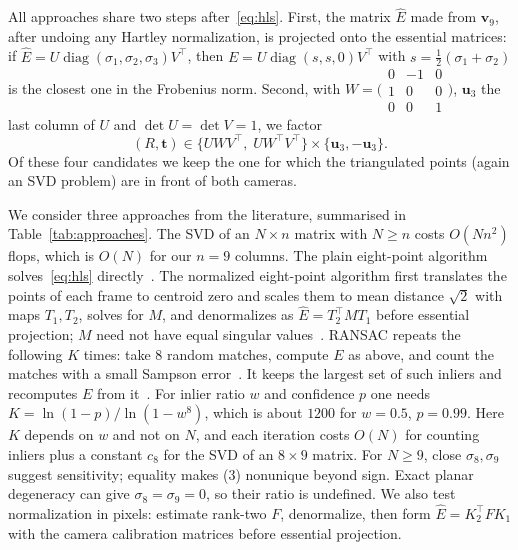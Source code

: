 \documentclass[11pt,a4paper]{article}
\DeclareMathOperator{\diag}{diag}
\theoremstyle{plain}
\theoremstyle{definition}
\theoremstyle{remark}
\begin{document}
All approaches share two steps after~\eqref{eq:hls}. First, the matrix $\hat E$ made from $\mathbf{v}_9$, after undoing any Hartley normalization, is projected onto the essential matrices: if $\hat E=U\diag(\sigma_1,\sigma_2,\sigma_3)V^{\top}$, then $E=U\diag(s,s,0)V^{\top}$ with $s=\frac12(\sigma_1+\sigma_2)$ is the closest one in the Frobenius norm. Second, with $W=\bigl(\begin{smallmatrix}0&-1&0\\1&0&0\\0&0&1\end{smallmatrix}\bigr)$, $\mathbf{u}_3$ the last column of $U$ and $\det U=\det V=1$, we factor
\begin{equation}\label{eq:decomp}
  (R,\mathbf{t})\in\bigl\{UWV^{\top},\;UW^{\top}V^{\top}\bigr\}\times\{\mathbf{u}_3,-\mathbf{u}_3\}.
\end{equation}
Of these four candidates we keep the one for which the triangulated points (again an SVD problem) are in front of both cameras.

We consider three approaches from the literature, summarised in Table~\ref{tab:approaches}. The SVD of an $N\times n$ matrix with $N\ge n$ costs $O(Nn^2)$ flops, which is $O(N)$ for our $n=9$ columns. The plain eight-point algorithm solves~\eqref{eq:hls} directly~\cite{Hartley97}. The normalized eight-point algorithm first translates the points of each frame to centroid zero and scales them to mean distance $\sqrt2$ with maps $T_1,T_2$, solves for $M$, and denormalizes as $\hat E=T_2^{\top}M T_1$ before essential projection; $M$ need not have equal singular values~\cite{Hartley97}. RANSAC repeats the following $K$ times: take $8$ random matches, compute $E$ as above, and count the matches with a small Sampson error~\cite[Sec.~11.4.3]{HartleyZisserman}. It keeps the largest set of such inliers and recomputes $E$ from it~\cite{HartleyZisserman,ScaramuzzaII}. For inlier ratio $w$ and confidence $p$ one needs $K=\ln(1-p)/\ln(1-w^8)$, which is about $1200$ for $w=0.5$, $p=0.99$. Here $K$ depends on $w$ and not on $N$, and each iteration costs $O(N)$ for counting inliers plus a constant $c_8$ for the SVD of an $8\times 9$ matrix. For $N\ge9$, close $\sigma_8,\sigma_9$ suggest sensitivity; equality makes (3) nonunique beyond sign. Exact planar degeneracy can give $\sigma_8=\sigma_9=0$, so their ratio is undefined. We also test normalization in pixels: estimate rank-two $F$, denormalize, then form $\hat E=K_2^\top F K_1$ with the camera calibration matrices before essential projection.
\end{document}
